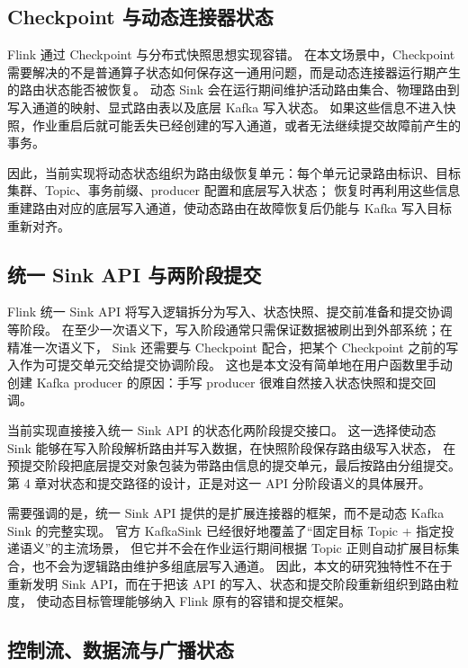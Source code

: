 \subsection{Checkpoint 与动态连接器状态}

Flink 通过 Checkpoint 与分布式快照思想实现容错\cite{carbone2015flink}。
在本文场景中，Checkpoint 需要解决的不是普通算子状态如何保存这一通用问题，而是动态连接器运行期产生的路由状态能否被恢复。
动态 Sink 会在运行期间维护活动路由集合、物理路由到写入通道的映射、显式路由表以及底层 Kafka 写入状态。
如果这些信息不进入快照，作业重启后就可能丢失已经创建的写入通道，或者无法继续提交故障前产生的事务。

因此，当前实现将动态状态组织为路由级恢复单元：每个单元记录路由标识、目标集群、Topic、事务前缀、producer 配置和底层写入状态；
恢复时再利用这些信息重建路由对应的底层写入通道，使动态路由在故障恢复后仍能与 Kafka 写入目标重新对齐。

\subsection{统一 Sink API 与两阶段提交}

Flink 统一 Sink API 将写入逻辑拆分为写入、状态快照、提交前准备和提交协调等阶段\cite{flinkKafkaDocs,flinkUnifiedSink}。
在至少一次语义下，写入阶段通常只需保证数据被刷出到外部系统；在精准一次语义下，
Sink 还需要与 Checkpoint 配合，把某个 Checkpoint 之前的写入作为可提交单元交给提交协调阶段。
这也是本文没有简单地在用户函数里手动创建 Kafka producer 的原因：手写 producer 很难自然接入状态快照和提交回调。

当前实现直接接入统一 Sink API 的状态化两阶段提交接口。
这一选择使动态 Sink 能够在写入阶段解析路由并写入数据，在快照阶段保存路由级写入状态，
在预提交阶段把底层提交对象包装为带路由信息的提交单元，最后按路由分组提交。
第 4 章对状态和提交路径的设计，正是对这一 API 分阶段语义的具体展开。

需要强调的是，统一 Sink API 提供的是扩展连接器的框架，而不是动态 Kafka Sink 的完整实现。
官方 KafkaSink 已经很好地覆盖了“固定目标 Topic + 指定投递语义”的主流场景\cite{flinkKafkaDocs}，
但它并不会在作业运行期间根据 Topic 正则自动扩展目标集合，也不会为逻辑路由维护多组底层写入通道。
因此，本文的研究独特性不在于重新发明 Sink API，而在于把该 API 的写入、状态和提交阶段重新组织到路由粒度，
使动态目标管理能够纳入 Flink 原有的容错和提交框架。

\subsection{控制流、数据流与广播状态}

